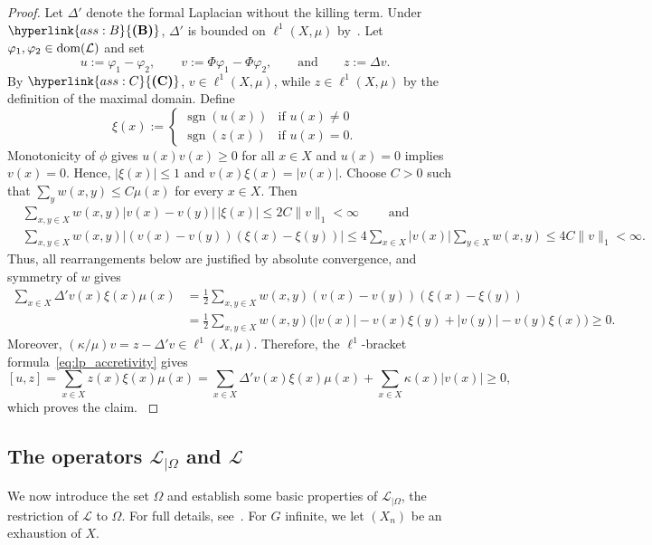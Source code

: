 \documentclass[letterpaper]{article}
\theoremstyle{definition}
\theoremstyle{named}
\numberwithin{equation}{section}
\newcommand{\B}{\hyperlink{ass:B}{\textup{\textbf{(B)}}}}
\newcommand{\C}{\hyperlink{ass:C}{\textup{\textbf{(C)}}}}
\newcommand{\sgn}{\operatorname{sgn}}
\newcommand{\dom}{\textnormal{dom}} %
\newcommand{\Deltaphi}{\mathcal{L}}
\newcommand{\Deltaphiom}{\Deltaphi_{|\Omega}}
\begin{document}
\begin{proof}
{
Let $\Delta'$ denote the formal Laplacian without the killing term.
Under $\B$, $\Delta'$ is bounded on $\ell^1(X,\mu)$
by~\cite[Theorem~2.15]{keller2021graphs}. Let
$\varphi_1,\varphi_2\in\dom(\Deltaphi)$ and set
\[
 u:=\varphi_1-\varphi_2,\qquad
 v:=\Phi\varphi_1-\Phi\varphi_2,\qquad \text{and} \qquad
 z:=\Delta v.
\]
By $\C$, $v\in\ell^1(X,\mu)$, while $z\in\ell^1(X,\mu)$ by the
definition of the maximal domain. Define
\[
 \xi(x):=
 \begin{cases}
  \sgn(u(x))& \text{if }u(x)\neq0\\
  \sgn(z(x))& \text{if }u(x)=0.
 \end{cases}
\]
Monotonicity of $\phi$ gives
$u(x)v(x)\geq0$ for all $x \in X$ and $u(x)=0$ implies $v(x)=0$. Hence,
$|\xi(x)|\leq1$ and $v(x)\xi(x)=|v(x)|$.
{ Choose $C>0$ such that
$\sum_yw(x,y)\leq C\mu(x)$ for every $x\in X$. Then
\[
\begin{aligned}
&\sum_{x,y\in X}w(x,y)|v(x)-v(y)|\,|\xi(x)|
 \leq2C\|v\|_1<\infty  \qquad \text{ and }\\
&\sum_{x,y\in X}w(x,y)
 |(v(x)-v(y))(\xi(x)-\xi(y))| \leq4\sum_{x\in X}|v(x)|\sum_{y\in X}w(x,y)
\leq4C\|v\|_1<\infty.
\end{aligned}
\]
Thus, all rearrangements below are justified by absolute convergence, and
symmetry of $w$ gives}
\[
\begin{aligned}
\sum_{x\in X}\Delta'v(x)\xi(x)\mu(x)
&=\frac12\sum_{x,y\in X}w(x,y)(v(x)-v(y))(\xi(x)-\xi(y))\\
&=\frac12\sum_{x,y\in X}w(x,y)
\bigl(|v(x)|-v(x)\xi(y)+|v(y)|-v(y)\xi(x)\bigr)\geq0.
\end{aligned}
\]
Moreover, $(\kappa/\mu)v=z-\Delta'v\in\ell^1(X,\mu)$. Therefore, the
$\ell^1$-bracket formula~\eqref{eq:lp_accretivity} gives
\[
[u,z]= \sum_{x\in X}z(x)\xi(x)\mu(x) = \sum_{x\in X}\Delta'v(x)\xi(x)\mu(x)
+\sum_{x\in X}\kappa(x)|v(x)|\geq0,
\]
which proves the claim.
}
\end{proof}


\subsection{\texorpdfstring{The operators $\Deltaphiom$ and $\Deltaphi$}{The operators Delta Phi on Omega and Delta Phi}}\label{SSect:Omega}
We now introduce the set $\Omega$ and establish some basic properties
of $\Deltaphiom$, the restriction of $\Deltaphi$ to $\Omega$.
For full details, see~\cite{bianchi2022generalized}.
For $G$ infinite, we let $(X_n)$ be an exhaustion of $X$.
\end{document}
